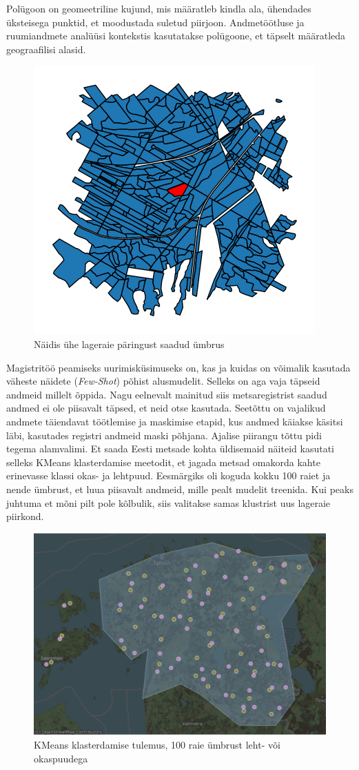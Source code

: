 Polügoon on geomeetriline kujund, mis määratleb kindla ala, ühendades üksteisega
punktid, et moodustada suletud piirjoon. Andmetöötluse ja ruumiandmete analüüsi
kontekstis kasutatakse polügoone, et täpselt määratleda geograafilisi alasid. \cite{WhatLocationPolygon}

\begin{figure}[H]
    \centering
    \includegraphics[width=.5\textwidth]{figures/andmestik/er_id_is10124223.png}
    \caption{Näidis ühe lageraie päringust saadud ümbrus}
    \label{fig:umbrusexample}
\end{figure}

Magistritöö peamiseks uurimisküsimuseks on, kas ja kuidas on võimalik kasutada väheste näidete (\textit{Few-Shot}) põhist alusmudelit. Selleks on aga vaja täpseid andmeid millelt õppida. Nagu eelnevalt mainitud siis metsaregistrist saadud andmed ei ole piisavalt täpsed, et neid otse kasutada. Seetõttu on vajalikud andmete täiendavat töötlemise ja maskimise etapid, kus andmed käiakse käsitsi läbi, kasutades registri andmeid maski põhjana. Ajalise piirangu tõttu pidi tegema alamvalimi. Et saada Eesti metsade kohta üldisemaid näiteid kasutati selleks KMeans klasterdamise meetodit, et jagada metsad omakorda kahte erinevasse klassi okas- ja lehtpuud. Eesmärgiks oli koguda kokku 100 raiet ja nende ümbrust, et luua piisavalt andmeid, mille pealt mudelit treenida. Kui peaks juhtuma et mõni pilt pole kõlbulik, siis valitakse samas klustrist uus lageraie piirkond.

\begin{figure}[H]
    \centering
    \includegraphics[width=.9\textwidth]{figures/andmestik/kmeansmap.png}
    \caption{KMeans klasterdamise tulemus, 100 raie ümbrust leht- või okaspuudega}
    \label{fig:kmeans}
\end{figure}


